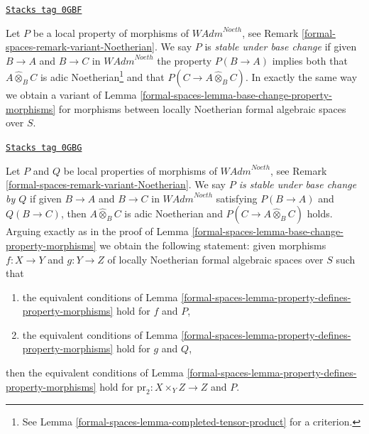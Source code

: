 \begin{remark}

\label{formal-spaces-remark-base-change-variant-Noetherian}
\href{https://stacks.math.columbia.edu/tag/0GBF}{\texttt{Stacks tag 0GBF}}

Let $P$ be a local property of morphisms of $\textit{WAdm}^{Noeth}$, see
Remark \ref{formal-spaces-remark-variant-Noetherian}. We say $P$ is
{\it stable under base change} if given $B \to A$ and $B \to C$
in $\textit{WAdm}^{Noeth}$ the property $P(B \to A)$
implies both that $A \widehat{\otimes}_B C$ is adic
Noetherian\footnote{See Lemma \ref{formal-spaces-lemma-completed-tensor-product}
for a criterion.} and that
$P(C \to A \widehat{\otimes}_B C)$.
In exactly the same way we obtain a variant of
Lemma \ref{formal-spaces-lemma-base-change-property-morphisms}
for morphisms between locally Noetherian formal algebraic spaces over $S$.
\end{remark}

\begin{remark}

\label{formal-spaces-remark-base-change-variant-variant-Noetherian}
\href{https://stacks.math.columbia.edu/tag/0GBG}{\texttt{Stacks tag 0GBG}}

Let $P$ and $Q$ be local properties of morphisms of
$\textit{WAdm}^{Noeth}$, see Remark \ref{formal-spaces-remark-variant-Noetherian}.
We say {\it $P$ is stable under base change by $Q$}
if given $B \to A$ and $B \to C$ in $\textit{WAdm}^{Noeth}$
satisfying $P(B \to A)$ and $Q(B \to C)$, then
$A \widehat{\otimes}_B C$ is adic Noetherian and
$P(C \to A \widehat{\otimes}_B C)$ holds.
Arguing exactly as in the proof of
Lemma \ref{formal-spaces-lemma-base-change-property-morphisms}
we obtain the following statement:
given morphisms $f : X \to Y$ and $g : Y \to Z$ of
locally Noetherian formal algebraic spaces over $S$
such that
\begin{enumerate}
\item the equivalent conditions of
Lemma \ref{formal-spaces-lemma-property-defines-property-morphisms}
hold for $f$ and $P$,
\item the equivalent conditions of
Lemma \ref{formal-spaces-lemma-property-defines-property-morphisms}
hold for $g$ and $Q$,
\end{enumerate}
then the equivalent conditions of
Lemma \ref{formal-spaces-lemma-property-defines-property-morphisms}
hold for $\text{pr}_2 : X \times_Y Z \to Z$ and $P$.
\end{remark}


